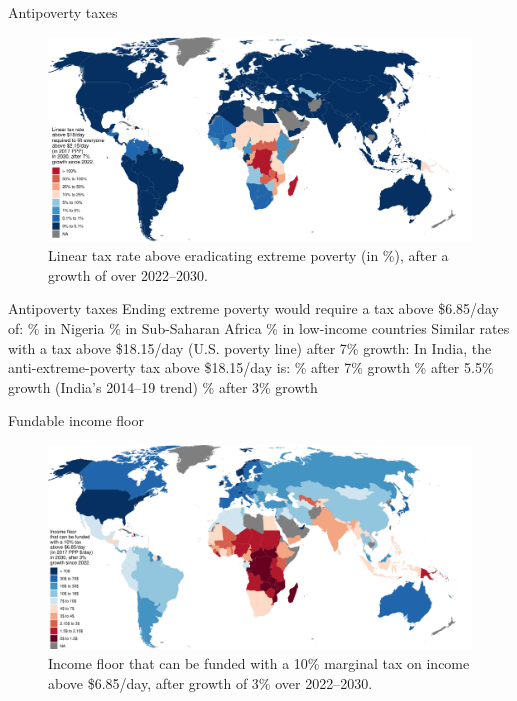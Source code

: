 \documentclass[aspectratio=169,xcolor=dvipsnames, 11pt,mathserif]{beamer}
\begin{document}
\begin{frame}{Antipoverty taxes}    
    \begin{figure}
      \caption{Linear tax rate above  eradicating extreme poverty (in \%), after a growth of  over 2022--2030. 
      }
      \includegraphics[height=.85\textheight]{../figures/antipoverty_2_tax_18_very_optimistic.pdf}
    \end{figure}
\end{frame}

\begin{frame}{Antipoverty taxes}   
    \bbsp 
    \ip Ending extreme poverty would require a tax above \$6.85/day of:
    \bbvsp {}\% in Nigeria 
     \% in Sub-Saharan Africa
     \% in low-income countries
     \ee
    \ip Similar rates with a tax above \$18.15/day (U.S. poverty line) after 7\% growth:
    \ip In India, the anti-extreme-poverty tax above \$18.15/day is:
    \bbvsp {}\% after 7\% growth
      \% after 5.5\% growth (India's 2014--19 trend)
      \% after 3\% growth
    \ee
    \ee 
\end{frame}

\begin{frame}{Fundable income floor}    
    \begin{figure}
      \caption{Income floor that can be funded with a 10\% marginal tax on income above \$6.85/day, after growth of 3\% over 2022--2030. 
      }
      \includegraphics[height=.85\textheight]{../figures/demogrant_7__10.pdf}
    \end{figure}
\end{frame}
\end{document}
